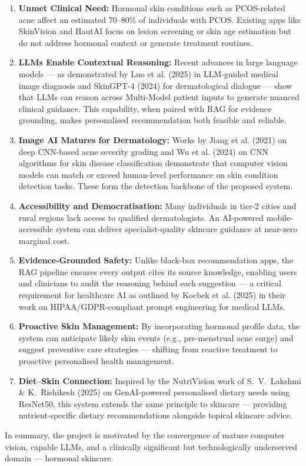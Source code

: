 \begin{enumerate}
    \item \textbf{Unmet Clinical Need:} Hormonal skin conditions such as PCOS-related acne affect an estimated 70--80\% of individuals with PCOS. Existing apps like SkinVision and HautAI focus on lesion screening or skin age estimation but do not address hormonal context or generate treatment routines.

    \item \textbf{LLMs Enable Contextual Reasoning:} Recent advances in large language models — as demonstrated by Luo et al. (2025) in LLM-guided medical image diagnosis and SkinGPT-4 (2024) for dermatological dialogue — show that LLMs can reason across Multi-Model patient inputs to generate nuanced clinical guidance. This capability, when paired with RAG for evidence grounding, makes personalised recommendation both feasible and reliable.

    \item \textbf{Image AI Matures for Dermatology:} Works by Jiang et al. (2021) on deep CNN-based acne severity grading and Wu et al. (2024) on CNN algorithms for skin disease classification demonstrate that computer vision models can match or exceed human-level performance on skin condition detection tasks. These form the detection backbone of the proposed system.

    \item \textbf{Accessibility and Democratisation:} Many individuals in tier-2 cities and rural regions lack access to qualified dermatologists. An AI-powered mobile-accessible system can deliver specialist-quality skincare guidance at near-zero marginal cost.

    \item \textbf{Evidence-Grounded Safety:} Unlike black-box recommendation apps, the RAG pipeline ensures every output cites its source knowledge, enabling users and clinicians to audit the reasoning behind each suggestion — a critical requirement for healthcare AI as outlined by Kocbek et al. (2025) in their work on HIPAA/GDPR-compliant prompt engineering for medical LLMs.

    \item \textbf{Proactive Skin Management:} By incorporating hormonal profile data, the system can anticipate likely skin events (e.g., pre-menstrual acne surge) and suggest preventive care strategies — shifting from reactive treatment to proactive personalised health management.

    \item \textbf{Diet--Skin Connection:} Inspired by the NutriVision work of S.~V.~Lakshmi \& K.~Rishikesh (2025) on GenAI-powered personalised dietary needs using ResNet50, this system extends the same principle to skincare — providing nutrient-specific dietary recommendations alongside topical skincare advice.
\end{enumerate}
\vspace{1\baselineskip}
\hspace*{0.5in}In summary, the project is motivated by the convergence of mature computer vision, capable LLMs, and a clinically significant but technologically underserved domain — hormonal skincare.\\

